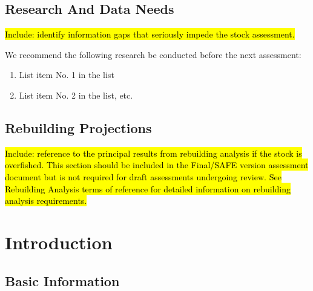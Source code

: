 \documentclass[12pt,]{article}
\begin{document}
\FloatBarrier

\newpage

\subsection*{Research And Data Needs}\label{research-and-data-needs}

\hl{Include: identify information gaps that seriously impede the stock assessment.}

We recommend the following research be conducted before the next
assessment:

\begin{enumerate}

\item List item No. 1 in the list

\item List item No. 2 in the list, etc.

\end{enumerate}

\subsection*{Rebuilding Projections}\label{rebuilding-projections}

\hl{Include: reference to the principal results from rebuilding analysis if the 
stock is overfished. This section should be included in the Final/SAFE version 
assessment document but is not required for draft assessments undergoing review. 
See Rebuilding Analysis terms of reference for detailed information on 
rebuilding analysis requirements.}

\FloatBarrier

\newpage

\renewcommand{\thefigure}{\arabic{figure}}
\renewcommand{\thetable}{\arabic{table}}

\setcounter{figure}{0} \setcounter{table}{0} 

\section{Introduction}\label{introduction}

\subsection{Basic Information}\label{basic-information}
\end{document}
